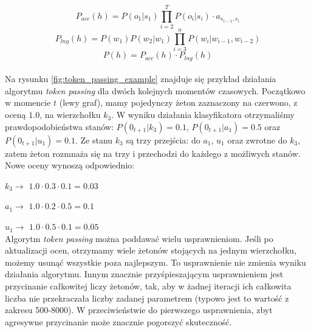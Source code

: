 \documentclass[a4paper,11pt,onecolumn,twoside,openright,titlepage]{article}
\begin{document}
		\begin{equation}
			P_{acc}(h) = P(o_1|s_1) \prod_{i=2}^T P(o_i|s_i) \cdot a_{s_{i-1},s_i}
		\end{equation}
		\begin{equation}
			P_{lng}(h) = P(w_1)P(w_2|w_1)\prod_{i=3}^nP(w_i|w_{i-1},w_{i-2})
		\end{equation}
		\begin{equation}
			P(h) = P_{acc}(h) \cdot P_{lng}(h)
			\label{eqn:h_score}
		\end{equation}
		\\
		Na rysunku \ref{fig:token_passing_example} znajduje się przykład działania algorytmu \textit{token passing} dla dwóch kolejnych momentów czasowych. Początkowo w momencie $t$ (lewy graf), mamy pojedynczy żeton zaznaczony na czerwono, z oceną $1.0$, na wierzchołku $k_3$. W wyniku działania klasyfikatora otrzymaliśmy prawdopodobieństwa stanów: $P(0_{t+1}|k_3)=0.1$, $P(0_{t+1}|a_1)=0.5$ oraz $P(0_{t+1}|u_1)=0.1$. Ze stanu $k_3$ są trzy przejścia: do $a_1$, $u_1$ oraz zwrotne do $k_3$, zatem żeton rozmnaża się na trzy i przechodzi do każdego z możliwych stanów. Nowe oceny wynoszą odpowiednio: 
		
		$k_3 \longrightarrow$ $1.0 \cdot 0.3 \cdot 0.1 = 0.03$
		
		$a_1 \longrightarrow$ $1.0 \cdot 0.2 \cdot 0.5 = 0.1$
		
		$u_1 \longrightarrow$ $1.0 \cdot 0.5 \cdot 0.1 = 0.05$
		\\
		Algorytm \textit{token passing} można poddawać wielu usprawnieniom. Jeśli po aktualizacji ocen, otrzymamy wiele żetonów stojących na jednym wierzchołku, możemy usunąć wszystkie poza najlepszym. To usprawnienie nie zmienia wyniku działania algorytmu. Innym znacznie przyśpieszającym usprawnieniem jest przycinanie całkowitej liczy żetonów, tak, aby w żadnej iteracji ich całkowita liczba nie przekraczała liczby zadanej parametrem (typowo jest to wartość z zakresu 500-8000). W przeciwieństwie do pierwszego usprawnienia, zbyt agresywne przycinanie może znacznie pogorszyć skuteczność.
		
\end{document}
